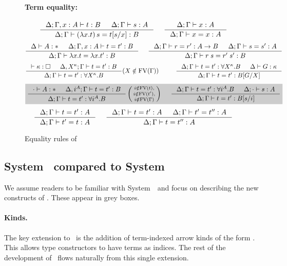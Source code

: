 \begin{figure}
\begin{singlespace}
\paragraph{Term equality:} 
\[
   \inference{\Delta;\Gamma,x:A |- t:B & \Delta;\Gamma |- s:A}{
              \Delta;\Gamma |- (\lambda x.t)\,s=t[s/x] : B}
 ~~~~
   \inference{\Delta;\Gamma |- x:A}{\Delta;\Gamma |- x=x:A}
\]
\[ \inference{\Delta |- A:* & \Delta;\Gamma,x:A |- t=t':B}{
              \Delta;\Gamma |- \lambda x.t = \lambda x.t':B}
 ~~~~
   \inference{\Delta;\Gamma |- r=r':A-> B & \Delta;\Gamma |- s=s':A}{
              \Delta;\Gamma |- r\;s=r'\;s':B}
\]
\[ \inference{|- \kappa:\square & \Delta, X^\kappa;\Gamma |- t=t' : B}{
              \Delta;\Gamma |- t=t' : \forall X^\kappa.B}
	     (X\notin\FV(\Gamma))
 ~~~~ ~~~~
   \inference{ \Delta;\Gamma |- t=t' : \forall X^\kappa.B
             & \Delta |- G:\kappa }{
              \Delta;\Gamma |- t=t' : B[G/X]}
\]
\[ \newFi{
   \inference{\cdot |- A:* & \Delta, i^A;\Gamma |- t=t' : B}{
              \Delta;\Gamma |- t=t' : \forall i^A.B}
   \left(\begin{smallmatrix}
		i\notin\FV(t),\\
		i\notin\FV(t'),\\
		i\notin\FV(\Gamma)\end{smallmatrix}\right)
 ~~~~
   \inference{ \Delta;\Gamma |- t=t' : \forall i^A.B
             & \Delta;\cdot |- s:A}{
              \Delta;\Gamma |- t=t' : B[s/i]} }
\]
\[ \inference{\Delta;\Gamma |- t=t':A}{\Delta;\Gamma |- t'=t:A}
 ~~~~
   \inference{\Delta;\Gamma |- t=t':A & \Delta;\Gamma |- t'=t'':A}{
              \Delta;\Gamma |- t=t'':A}
\]
\end{singlespace}
\caption{Equality rules of \Fi}
\label{fig:eqFi}
\end{figure}

\subsection{%
	System \Fi\ compared to System \Fw} \label{ssec:newFi}
We assume readers to be familiar with System~\Fw\
and focus on describing the new constructs of \Fi.  These appear in grey boxes.


\paragraph{Kinds.}
The key extension to \Fw\ is the addition of term-indexed arrow kinds of
the form \newFi{A -> \kappa}. This allows type constructors to have terms
as indices. The rest of the development of \Fi\ flows naturally from
this single extension.

